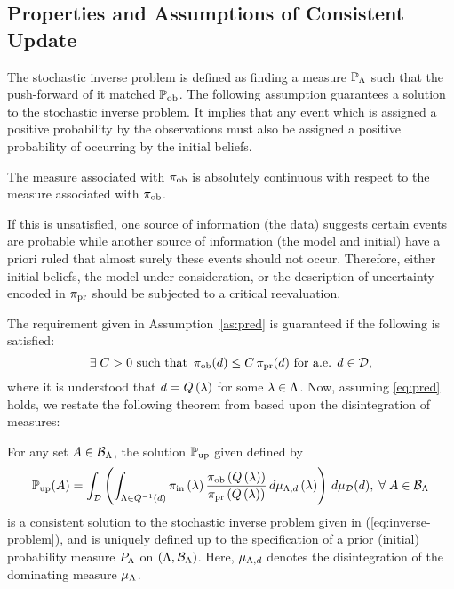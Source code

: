 \subsection{Properties and Assumptions of Consistent Update}\label{sec:properties}

The stochastic inverse problem is defined as finding a measure $\mathbb{P}_{\Lambda}$ such that the push-forward of it matched $\operatorname*{\mathbb{P}_{ob}}$.
The following assumption guarantees a solution to the stochastic inverse problem.
It implies that any event which is assigned a positive probability by the observations must also be assigned a positive probability of occurring by the initial beliefs.

\begin{assumption}\label{as:pred}
  The measure associated with $\operatorname*{\pi_{ob}}$ is absolutely continuous with respect to the measure associated with $\operatorname*{\pi_{ob}}$.
\end{assumption}

If this is unsatisfied, one source of information (the data) suggests certain events are probable while another source of information (the model and initial) have a priori ruled that almost surely these events should not occur.
Therefore, either initial beliefs, the model under consideration, or the description of uncertainty encoded in $\operatorname*{\pi_{pr}}$ should be subjected to a critical reevaluation.


The requirement given in Assumption~\ref{as:pred} is guaranteed if the following is satisfied:
\begin{equation}\label{eq:pred}
  \exists \; C>0 \text{ such that } \operatorname*{\pi_{ob}} (d) \leq C \operatorname*{\pi_{pr}}(d) \text{ for a.e. } d\in \mathcal{D},
\end{equation}
where it is understood that $d = Q\left ( \lambda \right )$ for some $\lambda \in {\Lambda}$.
Now, assuming \eqref{eq:pred} holds, we restate the following theorem from \cite{BJW18} based upon the disintegration of measures:


\begin{thm}
  For any set $A\in \mathcal{B}_{{\Lambda}}$, the solution $\operatorname*{\mathbb{P}_{up}}$ given defined by
  \begin{equation}\label{eq:dci_sol}
    \operatorname*{\mathbb{P}_{up}} (A) = \int_{\mathcal{D}} \left (  \int_{{\Lambda} \in Q^{-1}(d)}  \operatorname*{\pi_{in}}\left ( \lambda \right ) \frac{\operatorname*{\pi_{ob}}\left ( Q\left ( \lambda \right ) \right )}{\operatorname*{\pi_{pr}}\left ( Q\left ( \lambda \right ) \right )} \, d\mu_{{\Lambda}, d} \left ( \lambda \right ) \right ) \, d\mu_{\mathcal{D}}(d), \; \forall \; A \in \mathcal{B}_{{\Lambda}}
  \end{equation}
  is a consistent solution to the stochastic inverse problem given in (\ref{eq:inverse-problem}), and is uniquely defined up to the specification of a prior (initial) probability measure $P_{\Lambda}$ on $({\Lambda}, \mathcal{B}_{{\Lambda}})$.
  Here, $\mu_{{\Lambda}, d}$ denotes the disintegration of the dominating measure $\mu_{\Lambda}$.
\end{thm}

